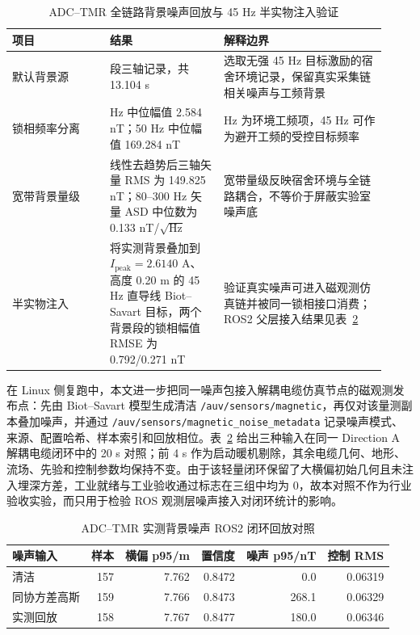 \begin{table}[htbp]
\centering
\small
\setlength{\tabcolsep}{4pt}
\caption{ADC--TMR 全链路背景噪声回放与 45 Hz 半实物注入验证}\label{tab:ch05-mag-chain-noise-replay}
\begin{tabular}{@{}>{\raggedright\arraybackslash}p{0.24\linewidth}>{\raggedright\arraybackslash}p{0.28\linewidth}>{\raggedright\arraybackslash}p{0.40\linewidth}@{}}
\toprule
项目 & 结果 & 解释边界 \\
\midrule
默认背景源 & 2 段三轴记录，共 13.104 s & 选取无强 45 Hz 目标激励的宿舍环境记录，保留真实采集链相关噪声与工频背景 \\
锁相频率分离 & 45 Hz 中位幅值 2.584 nT；50 Hz 中位幅值 169.284 nT & 50 Hz 为环境工频项，45 Hz 可作为避开工频的受控目标频率 \\
宽带背景量级 & 线性去趋势后三轴矢量 RMS 为 149.825 nT；80--300 Hz 矢量 ASD 中位数为 0.133 nT/\(\sqrt{\text{Hz}}\) & 宽带量级反映宿舍环境与全链路耦合，不等价于屏蔽实验室噪声底 \\
半实物注入 & 将实测背景叠加到 \(I_{\mathrm{peak}}=2.6140\text{ A}\)、高度 0.20 m 的 45 Hz 直导线 Biot--Savart 目标，两个背景段的锁相幅值 RMSE 为 0.792/0.271 nT & 验证真实噪声可进入磁观测仿真链并被同一锁相接口消费；ROS2 父层接入结果见表~\ref{tab:ch05-mag-chain-noise-ros} \\
\bottomrule
\end{tabular}
\end{table}
\FloatBarrier

在 Linux 侧复跑中，本文进一步把同一噪声包接入解耦电缆仿真节点的磁观测发布点：先由 Biot--Savart 模型生成清洁 \texttt{/auv/sensors/magnetic}，再仅对该量测副本叠加噪声，并通过 \texttt{/auv/sensors/magnetic\_noise\_metadata} 记录噪声模式、来源、配置哈希、样本索引和回放相位。表~\ref{tab:ch05-mag-chain-noise-ros} 给出三种输入在同一 Direction A 解耦电缆闭环中的 20 s 对照；前 4 s 作为启动暖机剔除，其余电缆几何、地形、流场、先验和控制参数均保持不变。由于该轻量闭环保留了大横偏初始几何且未注入埋深方差，工业就绪与工业验收通过标志在三组中均为 0，故本对照不作为行业验收实验，而只用于检验 ROS 观测层噪声接入对闭环统计的影响。

\begin{table}[htbp]
\centering
\small
\setlength{\tabcolsep}{3pt}
\caption{ADC--TMR 实测背景噪声 ROS2 闭环回放对照}\label{tab:ch05-mag-chain-noise-ros}
\begin{tabular}{@{}lrrrrr@{}}
\toprule
噪声输入 & 样本 & 横偏 p95/m & 置信度 & 噪声 p95/nT & 控制 RMS \\
\midrule
清洁 & 157 & 7.762 & 0.8472 & 0.0 & 0.06319 \\
同协方差高斯 & 159 & 7.766 & 0.8473 & 268.1 & 0.06329 \\
实测回放 & 158 & 7.767 & 0.8477 & 180.0 & 0.06346 \\
\bottomrule
\end{tabular}
\end{table}

